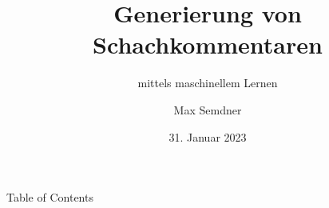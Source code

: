 \documentclass[aspectratio=169,xcolor=dvipsnames,pdf]{beamer}
\title{Generierung von Schachkommentaren}
\subtitle{mittels maschinellem Lernen}
\author{Max Semdner}
\institute{Frankfurt University of Applied Sciences}
\date{31. Januar 2023}
\begin{document}
\begin{frame}
\titlepage
\end{frame}

\begin{frame}{Table of Contents}
\tableofcontents
\end{frame}








\end{document}
